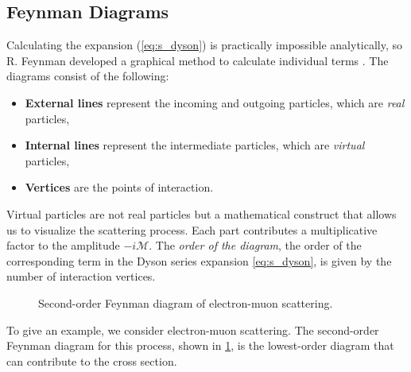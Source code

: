 \subsection{Feynman Diagrams}
\label{sec:feyman}
Calculating the expansion (\ref{eq:s_dyson}) is practically impossible analytically, so R. Feynman developed a graphical method to calculate individual terms \cite{feynman}.
The diagrams consist of the following:
\begin{itemize}
    \item \textbf{External lines} represent the incoming and outgoing particles, which are \emph{real} particles,
    \item \textbf{Internal lines} represent the intermediate particles, which are \emph{virtual} particles,
    \item \textbf{Vertices} are the points of interaction.    
\end{itemize}
Virtual particles are not real particles but a mathematical construct that allows us to visualize the scattering process.
Each part contributes a multiplicative factor to the amplitude $-i\mathcal{M}$.
The \emph{order of the diagram}, the order of the corresponding term in the Dyson series expansion \ref{eq:s_dyson}, is given by the number of interaction vertices.

\begin{figure}[htb]
\caption{Second-order Feynman diagram of electron-muon scattering.}
\label{fig:electron_muon}
\end{figure}
To give an example, we consider electron-muon scattering.
The second-order Feynman diagram for this process, shown in \cref{fig:electron_muon}, is the lowest-order diagram that can contribute to the cross section.

